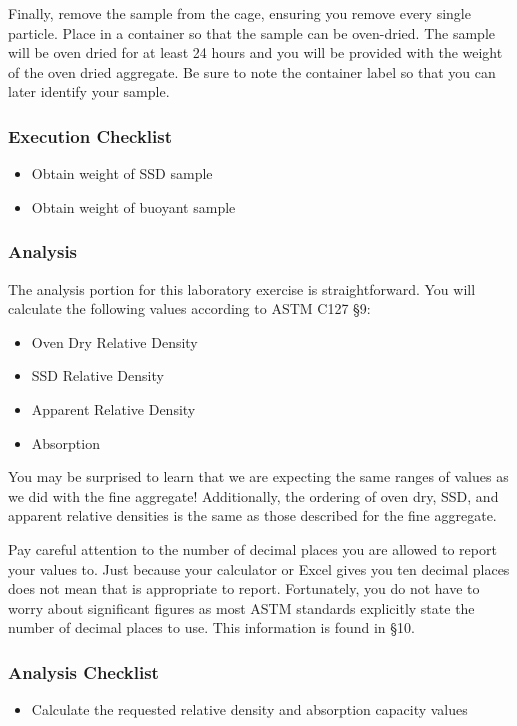 \documentclass[12pt]{article}
\begin{document}
Finally, remove the sample from the cage, ensuring you remove every single particle. Place in a container so that the sample can be oven-dried. The sample will be oven dried for at least 24 hours and you will be provided with the weight of the oven dried aggregate. Be sure to note the container label so that you can later identify your sample.

\subsubsection*{Execution Checklist}
\begin{itemize}
    \item Obtain weight of SSD sample
    \item Obtain weight of buoyant sample
\end{itemize}

\subsubsection{Analysis}
The analysis portion for this laboratory exercise is straightforward. You will calculate the following values according to ASTM C127 \S 9:
\begin{itemize}
    \item Oven Dry Relative Density
    \item SSD Relative Density
    \item Apparent Relative Density
    \item Absorption
\end{itemize}

You may be surprised to learn that we are expecting the same ranges of values as we did with the fine aggregate! Additionally, the ordering of oven dry, SSD, and apparent relative densities is the same as those described for the fine aggregate.

Pay careful attention to the number of decimal places you are allowed to report your values to. Just because your calculator or Excel gives you ten decimal places does not mean that is appropriate to report. Fortunately, you do not have to worry about significant figures as most ASTM standards explicitly state the number of decimal places to use. This information is found in \S10.

\subsubsection*{Analysis Checklist}
\begin{itemize}
    \item Calculate the requested relative density and absorption capacity values
\end{itemize}
\end{document}
